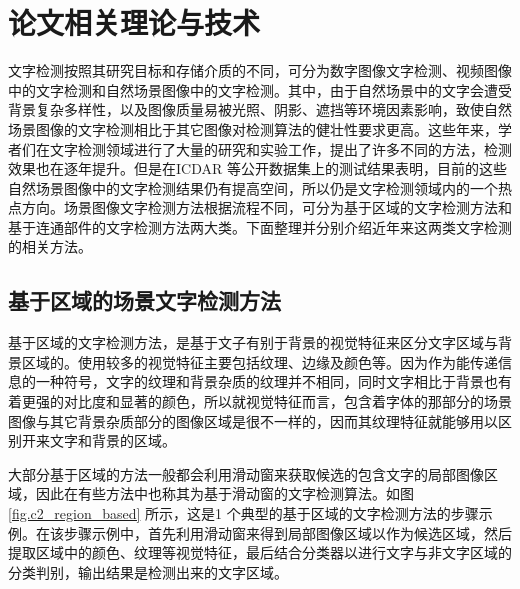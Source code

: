 ﻿%
%
%
%
%
%

\chapter{论文相关理论与技术}

    文字检测按照其研究目标和存储介质的不同，可分为数字图像文字检测、视频图像中的文字检测和自然场景图像中的文字检测。其中，由于自然场景中的文字会遭受背景复杂多样性，以及图像质量易被光照、阴影、遮挡等环境因素影响，致使自然场景图像的文字检测相比于其它图像对检测算法的健壮性要求更高。这些年来，学者们在文字检测领域进行了大量的研究和实验工作，提出了许多不同的方法，检测效果也在逐年提升。但是在ICDAR 等公开数据集上的测试结果表明，目前的这些自然场景图像中的文字检测结果仍有提高空间，所以仍是文字检测领域内的一个热点方向。场景图像文字检测方法根据流程不同，可分为基于区域的文字检测方法和基于连通部件的文字检测方法两大类。下面整理并分别介绍近年来这两类文字检测的相关方法。

    \section{基于区域的场景文字检测方法}

    基于区域的文字检测方法，是基于文子有别于背景的视觉特征来区分文字区域与背景区域的。使用较多的视觉特征主要包括纹理、边缘及颜色等。因为作为能传递信息的一种符号，文字的纹理和背景杂质的纹理并不相同，同时文字相比于背景也有着更强的对比度和显著的颜色，所以就视觉特征而言，包含着字体的那部分的场景图像与其它背景杂质部分的图像区域是很不一样的，因而其纹理特征就能够用以区别开来文字和背景的区域。

    大部分基于区域的方法一般都会利用滑动窗来获取候选的包含文字的局部图像区域，因此在有些方法中也称其为基于滑动窗的文字检测算法。如图\ref{fig.c2_region_based} 所示，这是1 个典型的基于区域的文字检测方法的步骤示例。在该步骤示例中，首先利用滑动窗来得到局部图像区域以作为候选区域，然后提取区域中的颜色、纹理等视觉特征，最后结合分类器以进行文字与非文字区域的分类判别，输出结果是检测出来的文字区域。

